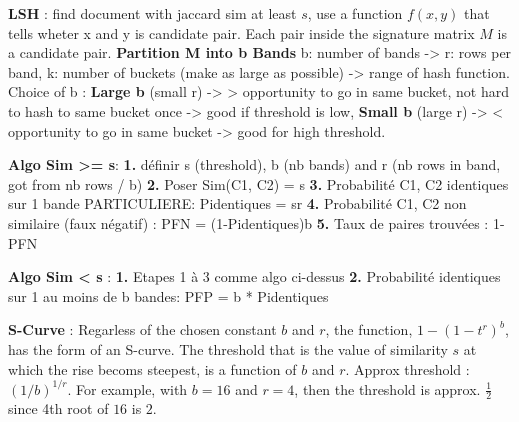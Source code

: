 \documentclass[9pt,a4paper]{report}
\begin{document}
\textbf{LSH} : find document with jaccard sim at least $s$, use a function $f(x,y)$ that tells wheter x and y is candidate pair. Each pair inside the signature matrix $M$ is a candidate pair. \textbf{Partition M into b Bands} b: number of bands -> r: rows per band, k: number of buckets (make as large as possible) -> range of hash function. Choice of b : \textbf{Large b} (small r) -> > opportunity to go in same bucket, not hard to hash to same bucket once -> good if threshold is low, \textbf{Small b} (large r) -> < opportunity to go in same bucket -> good for high threshold.

\textbf{Algo Sim >= s}: \textbf{1.} définir s (threshold), b (nb bands) and r (nb rows in band, got from nb rows / b)
\textbf{2.} Poser Sim(C1, C2) = s
\textbf{3.} Probabilité C1, C2 identiques sur 1 bande PARTICULIERE: Pidentiques = sr
\textbf{4.} Probabilité C1, C2 non similaire (faux négatif) : PFN = (1-Pidentiques)b
\textbf{5.} Taux de paires trouvées : 1-PFN

\textbf{Algo Sim < s} :
\textbf{1.} Etapes 1 à 3 comme algo ci-dessus
\textbf{2.} Probabilité identiques sur 1 au moins de b bandes: PFP = b *  Pidentiques

\textbf{S-Curve} : Regarless of the chosen constant $b$ and $r$, the function, $1-(1-t^r)^b$, has the form of an S-curve. The threshold that is the value of similarity $s$ at which the rise becoms steepest, is a function of $b$ and $r$. Approx threshold : $(1/b)^{1/r}$. For example, with $b=16$ and $r=4$, then the threshold is approx. $\frac{1}{2}$ since 4th root of $16$ is $2$.
\end{document}
